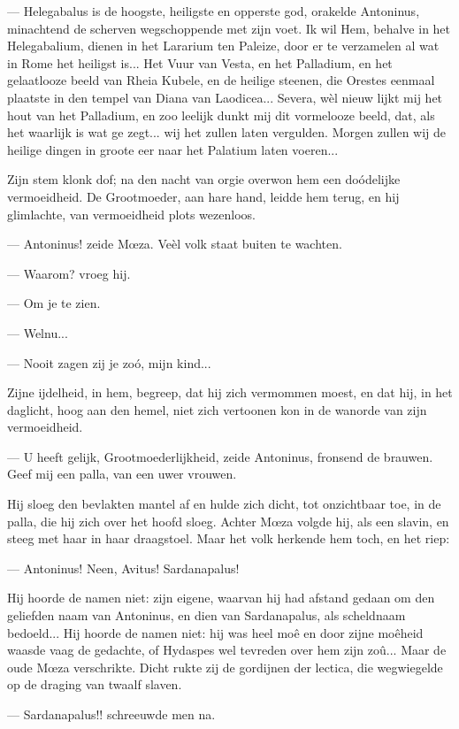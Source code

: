 \documentclass[a4paper, 12pt, oneside, dutch]{article}
\begin{document}
--- Helegabalus is de hoogste, heiligste en opperste god, orakelde Antoninus, minachtend de scherven wegschoppende met zijn voet. Ik wil Hem, behalve in het Helegabalium, dienen in het Lararium ten Paleize, door er te verzamelen al wat in Rome het heiligst is... Het Vuur van Vesta, en het Palladium, en het gelaatlooze beeld van Rheia Kubele, en de heilige steenen, die Orestes eenmaal plaatste in den tempel van Diana van Laodicea... Severa, wèl nieuw lijkt mij het hout van het Palladium, en zoo leelijk dunkt mij dit vormelooze beeld, dat, als het waarlijk is wat ge zegt... wij het zullen laten vergulden. Morgen zullen wij de heilige dingen in groote eer naar het Palatium laten voeren...

Zijn stem klonk dof; na den nacht van orgie overwon hem een doódelijke vermoeidheid. De Grootmoeder, aan hare hand, leidde hem terug, en hij glimlachte, van vermoeidheid plots wezenloos.

--- Antoninus! zeide Mœza. Veèl volk staat buiten te wachten.

--- Waarom? vroeg hij.

--- Om je te zien.

--- Welnu...

--- Nooit zagen zij je zoó, mijn kind...

Zijne ijdelheid, in hem, begreep, dat hij zich vermommen moest, en dat hij, in het daglicht, hoog aan den hemel, niet zich vertoonen kon in de wanorde van zijn vermoeidheid.

--- U heeft gelijk, Grootmoederlijkheid, zeide Antoninus, fronsend de brauwen. Geef mij een palla, van een uwer vrouwen.

Hij sloeg den bevlakten mantel af en hulde zich dicht, tot onzichtbaar toe, in de palla, die hij zich over het hoofd sloeg. Achter Mœza volgde hij, als een slavin, en steeg met haar in haar draagstoel. Maar het volk herkende hem toch, en het riep:

--- Antoninus! Neen, Avitus! Sardanapalus!

Hij hoorde de namen niet: zijn eigene, waarvan hij had afstand gedaan om den geliefden naam van Antoninus, en dien van Sardanapalus, als scheldnaam bedoeld... Hij hoorde de namen niet: hij was heel moê en door zijne moêheid waasde vaag de gedachte, of Hydaspes wel tevreden over hem zijn zoû... Maar de oude Mœza verschrikte. Dicht rukte zij de gordijnen der lectica, die wegwiegelde op de draging van twaalf slaven.

--- Sardanapalus!! schreeuwde men na.
\end{document}
